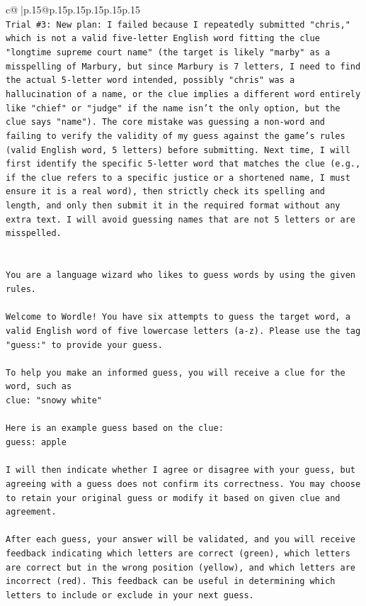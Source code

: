 \documentclass{article}
\begin{document}
{\begin{supertabular}{c@{$\;$}|p{.15\linewidth}@{}p{.15\linewidth}p{.15\linewidth}p{.15\linewidth}p{.15\linewidth}p{.15\linewidth}}
{{{\\ 
\texttt{Trial \#3: New plan: I failed because I repeatedly submitted "chris," which is not a valid five{-}letter English word fitting the clue "longtime supreme court name" (the target is likely "marby" as a misspelling of Marbury, but since Marbury is 7 letters, I need to find the actual 5{-}letter word intended, possibly "chris" was a hallucination of a name, or the clue implies a different word entirely like "chief" or "judge" if the name isn't the only option, but the clue says "name"). The core mistake was guessing a non{-}word and failing to verify the validity of my guess against the game's rules (valid English word, 5 letters) before submitting. Next time, I will first identify the specific 5{-}letter word that matches the clue (e.g., if the clue refers to a specific justice or a shortened name, I must ensure it is a real word), then strictly check its spelling and length, and only then submit it in the required format without any extra text. I will avoid guessing names that are not 5 letters or are misspelled.} \\
\\ 
\\ 
\texttt{You are a language wizard who likes to guess words by using the given rules.} \\
\\ 
\texttt{Welcome to Wordle! You have six attempts to guess the target word, a valid English word of five lowercase letters (a{-}z). Please use the tag "guess:" to provide your guess.} \\
\\ 
\texttt{To help you make an informed guess, you will receive a clue for the word, such as} \\
\texttt{clue: "snowy white"} \\
\\ 
\texttt{Here is an example guess based on the clue: } \\
\texttt{guess: apple} \\
\\ 
\texttt{I will then indicate whether I agree or disagree with your guess, but agreeing with a guess does not confirm its correctness. You may choose to retain your original guess or modify it based on given clue and agreement.} \\
\\ 
\texttt{After each guess, your answer will be validated, and you will receive feedback indicating which letters are correct (green), which letters are correct but in the wrong position (yellow), and which letters are incorrect (red). This feedback can be useful in determining which letters to include or exclude in your next guess.} \\
}}}
\end{supertabular}}
\end{document}
